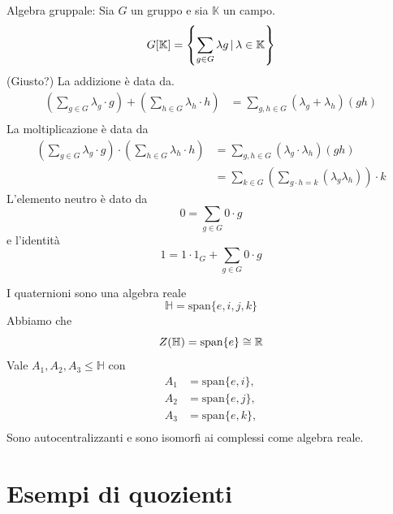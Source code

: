 \documentclass[a4paper]{article}
\begin{document}
Algebra gruppale: Sia \(G\) un gruppo e sia \(\mathbb{K}\) un campo.
\[
    G[\mathbb{K}] = \left\{
        \sum_{g\in G} \lambda g \,|\, \lambda \in \mathbb{K}
    \right\}
\]
(Giusto?)
La addizione è data da.
\begin{align*}
    \left( \sum_{g\in G} \lambda_g \cdot g \right)
    + \left( \sum_{h\in G} \lambda_h \cdot h \right)
    &= \sum_{g,h \in G} (\lambda_g + \lambda_h) (gh) \\
\end{align*}
La moltiplicazione è data da
\begin{align*}
    \left( \sum_{g\in G} \lambda_g \cdot g \right)
    \cdot \left( \sum_{h\in G} \lambda_h \cdot h \right)
    &= \sum_{g,h \in G} (\lambda_g \cdot \lambda_h) (gh) \\
    &= \sum_{k\in G} \left(\sum_{g\cdot h = k} (\lambda_g \lambda_h)
    \right) \cdot k
\end{align*}
L'elemento neutro è dato da
\[
    0 = \sum_{g\in G} 0 \cdot g
\]
e l'identità
\[
    1 = 1 \cdot 1_G + \sum_{g\in G} 0 \cdot g
\]

\begin{snippetexample}{I quaternioni sono una algebra reale}
    \[
        \mathbb{H} = \text{span}\{e,i,j,k\}
    \]
    Abbiamo che
    \[
        Z(\mathbb{H}) = \text{span}\{e\} \cong \mathbb{R}
    \]
    Vale \(A_1, A_2, A_3 \leq \mathbb{H}\)
    con
    \begin{align*}
        A_1 &= \text{span}\{e,i\}, \\
        A_2 &= \text{span}\{e,j\}, \\
        A_3 &= \text{span}\{e,k\}, \\
    \end{align*}
    Sono autocentralizzanti e sono isomorfi ai complessi come algebra reale.
\end{snippetexample}

\section{Esempi di quozienti}
\end{document}
